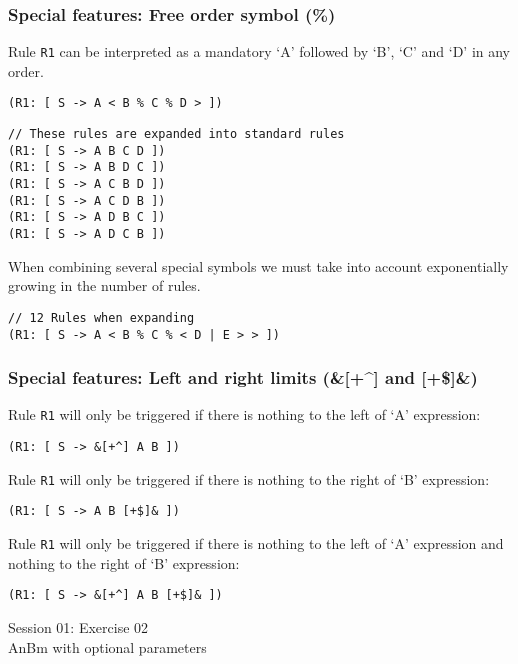 \documentclass[11pt]{beamer}
\begin{document}
\begin{frame}[fragile]
\frametitle{Special features: Free order symbol (\%)}
\small
Rule \texttt{R1} can be interpreted as a mandatory `A' followed by `B', `C' and `D' in any order.
\begin{lstlisting}[language=lekta]
(R1: [ S -> A < B % C % D > ])
\end{lstlisting}
\pause
\begin{lstlisting}[language=lekta]
// These rules are expanded into standard rules
(R1: [ S -> A B C D ])
(R1: [ S -> A B D C ])
(R1: [ S -> A C B D ])
(R1: [ S -> A C D B ])
(R1: [ S -> A D B C ])
(R1: [ S -> A D C B ])
\end{lstlisting}
\vspace{10pt}
\pause
When combining several special symbols we must take into account exponentially growing in the number of rules.
\begin{lstlisting}[language=lekta]
// 12 Rules when expanding
(R1: [ S -> A < B % C % < D | E > > ])
\end{lstlisting}
\end{frame}

\begin{frame}[fragile]
\frametitle{Special features: Left and right limits (\&[+\^{}] and [+\$]\&)}
\small
Rule \texttt{R1} will only be triggered if there is nothing to the left of `A' expression:
\begin{lstlisting}[language=lekta]
(R1: [ S -> &[+^] A B ])
\end{lstlisting}
\pause
\vspace{15pt}
Rule \texttt{R1} will only be triggered if there is nothing to the right of `B' expression:
\begin{lstlisting}[language=lekta]
(R1: [ S -> A B [+$]& ])
\end{lstlisting}
\pause
\vspace{15pt}
Rule \texttt{R1} will only be triggered if there is nothing to the left of `A' expression and nothing to the right of `B' expression:
\begin{lstlisting}[language=lekta]
(R1: [ S -> &[+^] A B [+$]& ])
\end{lstlisting}
\end{frame}

\begin{frame}[fragile]
\Huge
\begin{center}
Session 01: Exercise 02\\
AnBm with optional parameters
\end{center}
\end{frame}
\end{document}
